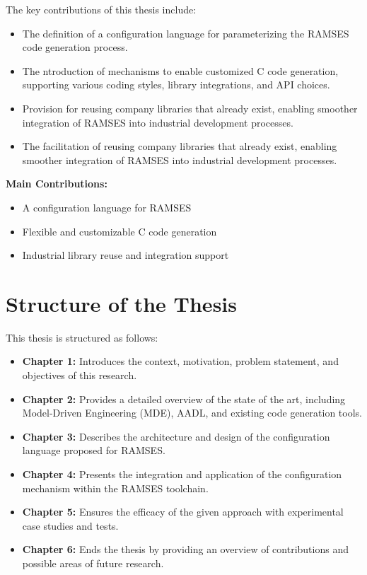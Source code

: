 The key contributions of this thesis include:
\begin{itemize}
	\item The definition of a configuration language for parameterizing the RAMSES code generation process.
	\item The ntroduction of mechanisms to enable customized C code generation, supporting various coding styles, library integrations, and API choices.
	\item Provision for reusing company libraries that already exist, enabling smoother integration of RAMSES into industrial development processes.
	\item The facilitation of reusing company libraries that already exist, enabling smoother integration of RAMSES into industrial development processes.
\end{itemize}

\begin{tcolorbox}[colback=blue!5]
	\textbf{Main Contributions:}
	\begin{itemize}
		\item A configuration language for RAMSES
		\item Flexible and customizable C code generation
		\item Industrial library reuse and integration support
	\end{itemize}
\end{tcolorbox}



\section{Structure of the Thesis}

This thesis is structured as follows:

\begin{itemize}
	\item \textbf{Chapter 1:} Introduces the context, motivation, problem statement, and objectives of this research.
	\item \textbf{Chapter 2:} Provides a detailed overview of the state of the art, including Model-Driven Engineering (MDE), AADL, and existing code generation tools.
	\item \textbf{Chapter 3:} Describes the architecture and design of the configuration language proposed for RAMSES.
	\item \textbf{Chapter 4:} Presents the integration and application of the configuration mechanism within the RAMSES toolchain.
	\item \textbf{Chapter 5:} Ensures the efficacy of the given approach with experimental case studies and tests.
	\item \textbf{Chapter 6:} Ends the thesis by providing an overview of contributions and possible areas of future research.
\end{itemize}











